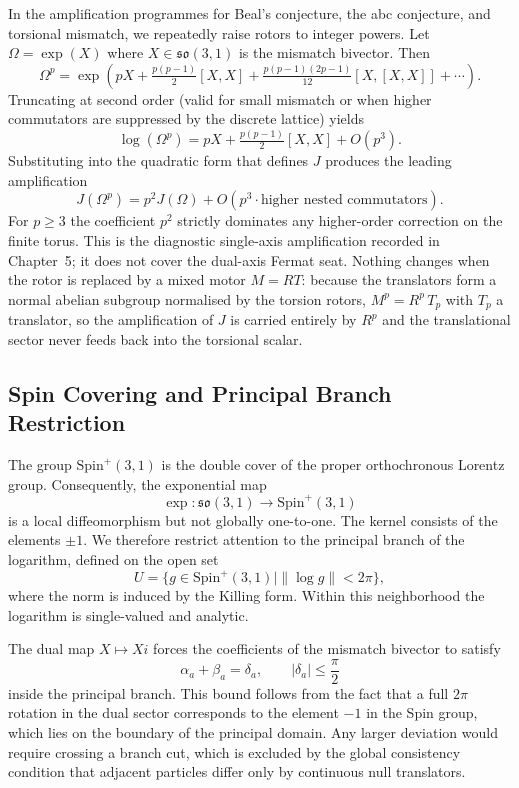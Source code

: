 \documentclass[a4paper]{article}
\theoremstyle{definition}
\theoremstyle{remark}
\begin{document}
In the amplification programmes for Beal’s conjecture, the abc conjecture, and torsional mismatch, we repeatedly raise rotors to integer powers. Let \( \Omega = \exp(X) \) where \( X \in \mathfrak{so}(3,1) \) is the mismatch bivector. Then
\[
\Omega^p = \exp(pX + \tfrac{p(p-1)}{2}[X,X] + \tfrac{p(p-1)(2p-1)}{12}[X,[X,X]] + \cdots).
\]
Truncating at second order (valid for small mismatch or when higher commutators are suppressed by the discrete lattice) yields
\[
\log(\Omega^p) = pX + \tfrac{p(p-1)}{2}[X,X] + O(p^3).
\]
Substituting into the quadratic form that defines \( J \) produces the leading amplification
\[
J(\Omega^p) = p^2 J(\Omega) + O(p^3 \cdot \text{higher nested commutators}).
\]
For \( p \geq 3 \) the coefficient \( p^2 \) strictly dominates any higher-order correction on the finite torus. This is the diagnostic single-axis amplification recorded in Chapter~5; it does not cover the dual-axis Fermat seat. Nothing changes when the rotor is replaced by a mixed motor \( M=RT \): because the translators form a normal abelian subgroup normalised by the torsion rotors, \( M^p = R^p\,T_p \) with \( T_p \) a translator, so the amplification of \( J \) is carried entirely by \( R^p \) and the translational sector never feeds back into the torsional scalar.

\subsection{Spin Covering and Principal Branch Restriction}

The group \( \mathrm{Spin}^+(3,1) \) is the double cover of the proper orthochronous Lorentz group. Consequently, the exponential map
\[
\exp : \mathfrak{so}(3,1) \to \mathrm{Spin}^+(3,1)
\]
is a local diffeomorphism but not globally one-to-one. The kernel consists of the elements \( \pm 1 \). We therefore restrict attention to the principal branch of the logarithm, defined on the open set
\[
U = \{ g \in \mathrm{Spin}^+(3,1) \mid \| \log g \| < 2\pi \},
\]
where the norm is induced by the Killing form. Within this neighborhood the logarithm is single-valued and analytic.

The dual map \( X \mapsto Xi \) forces the coefficients of the mismatch bivector to satisfy
\[
\alpha_a + \beta_a = \delta_a, \qquad |\delta_a| \leq \frac{\pi}{2}
\]
inside the principal branch. This bound follows from the fact that a full \( 2\pi \) rotation in the dual sector corresponds to the element \( -1 \) in the Spin group, which lies on the boundary of the principal domain. Any larger deviation would require crossing a branch cut, which is excluded by the global consistency condition that adjacent particles differ only by continuous null translators.
\end{document}
